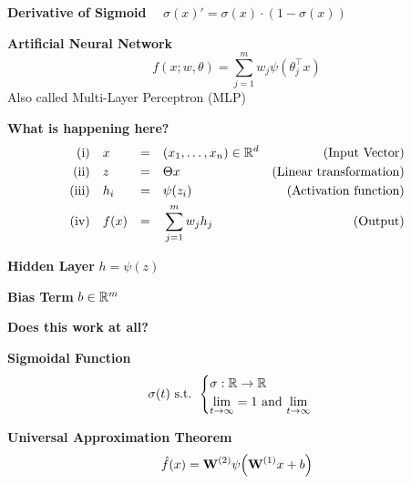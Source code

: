 {\footnotesize
    \remark \textbf{Derivative of Sigmoid} $\quad \sigma(x)' = \sigma(x)\cdot (1-\sigma(x))$
}

\newpage

 \textbf{Artificial Neural Network}\\
$$
    f(x;w,\theta) = \sum_{j=1}^{m}w_j\psi(\theta_j^\top x)
$$
{\scriptsize
    \remark Also called Multi-Layer Perceptron (MLP)
}

\textbf{What is happening here?}\\
\begin{align*}
    \text{(i)}      &\quad x       &=\quad& (x_1,\ldots,x_n) \in \mathbb{R}^d       & \text{(Input Vector)}             \\
    \text{(ii)}     &\quad z       &=\quad& \Theta x                        & \text{(Linear transformation)}    \\
    \text{(iii)}    &\quad h_i     &=\quad& \psi(z_i)                       & \text{(Activation function)}      \\
    \text{(iv)}     &\quad f(x)    &=\quad& \sum_{j=1}^m w_j h_j            & \text{(Output)}
\end{align*}

 \textbf{Hidden Layer} $h = \psi(z)$

 \textbf{Bias Term} $b \in \mathbb{R}^m$\\

\textbf{Does this work at all?}\\

 \textbf{Sigmoidal Function}
$$
    \sigma(t) \text{ s.t. } \begin{cases}
        \sigma: \mathbb{R} \to \mathbb{R} \\
        \underset{t\to\infty}{\lim} = 1 \text{ and } \underset{t\to\infty}{\lim}
    \end{cases}
$$

\theorem \textbf{Universal Approximation Theorem}\\
$$
    \hat{f}(x) = \textbf{W}^{(2)}\psi\Bigl( \textbf{W}^{(1)}x + b \Bigr)
$$ 
\\

